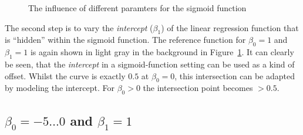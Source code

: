 \documentclass[
  a4paper,
]{scrbook}
\begin{document}
\begin{figure}[H]


\caption{\label{fig-sigmoid-params04}The influence of different
paramters for the sigmoid function}

\end{figure}%

The second step is to vary the \emph{intercept} (\(\beta_1\)) of the
linear regression function that is ``hidden'' within the sigmoid
function. The reference function for \(\beta_0 = 1\) and \(\beta_1 = 1\)
is again shown in light gray in the background in
Figure~\ref{fig-sigmoid-params04}. It can clearly be seen, that the
\emph{intercept} in a sigmoid-function setting can be used as a kind of
offset. Whilst the curve is exactly \(0.5\) at \(\beta_0 = 0\), this
intersection can be adapted by modeling the intercept. For
\(\beta_0 > 0\) the intersection point becomes \(>0.5\).

\newpage{}

\subsection{\texorpdfstring{\(\beta_0 = -5 \ldots 0\) and
\(\beta_1 = 1\)}{\textbackslash beta\_0 = -5 \textbackslash ldots 0 and \textbackslash beta\_1 = 1}}\label{beta_0--5-ldots-0-and-beta_1-1}
\end{document}
